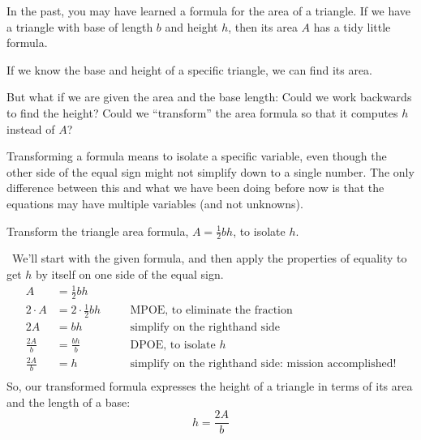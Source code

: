 In the past, you may have learned a formula for the area of a triangle. If we have a triangle with base of length $b$ and height $h$, then its area $A$ has a tidy little formula.
\begin{center}
\end{center}
If we know the base and height of a specific triangle, we can find its area.
\begin{center}
\end{center}
But what if we are given the area and the base length: Could we work backwards to find the height? Could we ``transform'' the area formula so that it computes $h$ instead of $A$?

Transforming a formula means to isolate a specific variable, even though the other side of the equal sign might not simplify down to a single number. The only difference between this and what we have been doing before now is that the equations may have multiple variables (and not unknowns).

\begin{boxedex}
Transform the triangle area formula, $A = \frac{1}{2}bh$, to isolate $h$.

\exsoln\ We'll start with the given formula, and then apply the properties of equality to get $h$ by itself on one side of the equal sign.
\[\begin{aligned}
A &= \frac{1}{2}bh \\[1ex]
2 \cdot A &= 2 \cdot \frac{1}{2} bh
&& \quad\text{MPOE, to eliminate the fraction}\\[1ex]
2A &= bh
&& \quad\text{simplify on the righthand side}\\[1ex]
\frac{2 A}{b} &= \frac{bh}{b}
&& \quad\text{DPOE, to isolate $h$}\\[1ex]
\frac{2 A}{b} &= h
&& \quad\text{simplify on the righthand side: mission accomplished!}\\[1ex]
\end{aligned}\]
So, our transformed formula expresses the height of a triangle in terms of its area and the length of a base: \[h = \frac{2A}{b}\]
\end{boxedex}

